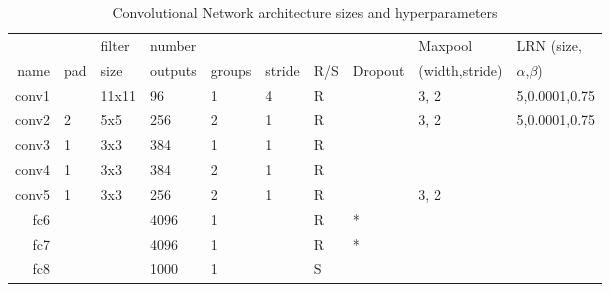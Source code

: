 \begin{table}[t]
\caption{Convolutional Network architecture sizes and hyperparameters}
\label{tab:network_architecture}
\begin{center}
\begin{tabular}{|r|l|l|l|l|l|l|l|l|l|}
\hline
       &      & filter & number  &        &        &     &         & Maxpool        & LRN (size,        \\
name   & pad  & size   & outputs & groups & stride & R/S & Dropout & (width,stride) & $\alpha$,$\beta$) \\
\hline
conv1  &      & 11x11  & 96      & 1      & 4      & R   &         & 3, 2           & 5,0.0001,0.75     \\
conv2  & 2    & 5x5    & 256     & 2      & 1      & R   &         & 3, 2           & 5,0.0001,0.75     \\
conv3  & 1    & 3x3    & 384     & 1      & 1      & R   &         &                &                   \\
conv4  & 1    & 3x3    & 384     & 2      & 1      & R   &         &                &                   \\
conv5  & 1    & 3x3    & 256     & 2      & 1      & R   &         & 3, 2           &                   \\
fc6    &      &        & 4096    & 1      &        & R   & *       &                &                   \\
fc7    &      &        & 4096    & 1      &        & R   & *       &                &                   \\
fc8    &      &        & 1000    & 1      &        & S   &         &                &                   \\
\hline
\end{tabular}
\end{center}
\end{table}




